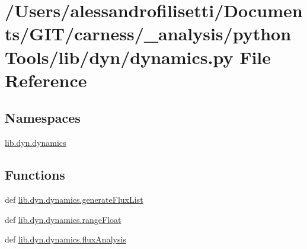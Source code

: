 \hypertarget{a00089}{\section{/\-Users/alessandrofilisetti/\-Documents/\-G\-I\-T/carness/\-\_\-analysis/python\-Tools/lib/dyn/dynamics.py File Reference}
\label{a00089}
}
\subsection*{Namespaces}
\begin{DoxyCompactItemize}
\item 
\hyperlink{a00138}{lib.\-dyn.\-dynamics}
\end{DoxyCompactItemize}
\subsection*{Functions}
\begin{DoxyCompactItemize}
\item 
def \hyperlink{a00138_a5c7482c3127ef70514cbc82ce1aa9f47}{lib.\-dyn.\-dynamics.\-generate\-Flux\-List}
\item 
def \hyperlink{a00138_acbc0de876640b8d5355bf6a0e4fdef4a}{lib.\-dyn.\-dynamics.\-range\-Float}
\item 
def \hyperlink{a00138_ac3232f52dce6e169a93eba81f8fb926e}{lib.\-dyn.\-dynamics.\-flux\-Analysis}
\end{DoxyCompactItemize}
